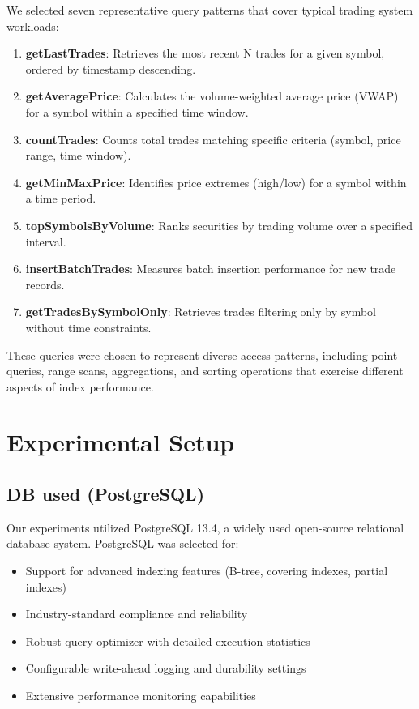 \documentclass[11pt,a4paper]{article}
\begin{document}
We selected seven representative query patterns that cover typical trading system workloads:

\begin{enumerate}
    \item \textbf{getLastTrades}: Retrieves the most recent N trades for a given symbol, ordered by timestamp descending.
    
    \item \textbf{getAveragePrice}: Calculates the volume-weighted average price (VWAP) for a symbol within a specified time window.
    
    \item \textbf{countTrades}: Counts total trades matching specific criteria (symbol, price range, time window).
    
    \item \textbf{getMinMaxPrice}: Identifies price extremes (high/low) for a symbol within a time period.
    
    \item \textbf{topSymbolsByVolume}: Ranks securities by trading volume over a specified interval.
    
    \item \textbf{insertBatchTrades}: Measures batch insertion performance for new trade records.
    
    \item \textbf{getTradesBySymbolOnly}: Retrieves trades filtering only by symbol without time constraints.
\end{enumerate}

These queries were chosen to represent diverse access patterns, including point queries, range scans, aggregations, and sorting operations that exercise different aspects of index performance.

\section{Experimental Setup}

\subsection{DB used (PostgreSQL)}

Our experiments utilized PostgreSQL 13.4, a widely used open-source relational database system. PostgreSQL was selected for:

\begin{itemize}
    \item Support for advanced indexing features (B-tree, covering indexes, partial indexes)
    \item Industry-standard compliance and reliability
    \item Robust query optimizer with detailed execution statistics
    \item Configurable write-ahead logging and durability settings
    \item Extensive performance monitoring capabilities
\end{itemize}
\end{document}
